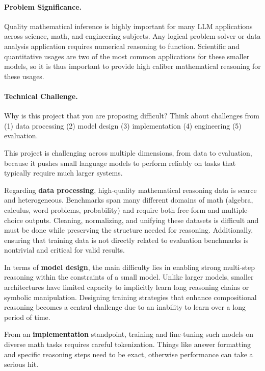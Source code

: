 \documentclass{article}
\begin{document}
\paragraph{Problem Significance.}
Quality mathematical inference is highly important for many LLM applications across science, math, and engineering subjects. Any logical problem-solver or data analysis application requires numerical reasoning to function. Scientific and quantitative usages are two of the most common applications for these smaller models, so it is thus important to provide high caliber mathematical reasoning for these usages.

\paragraph{Technical Challenge.}
Why is this project that you are proposing difficult? Think about challenges from (1) data processing (2) model design (3) implementation (4) engineering (5) evaluation. 

This project is challenging across multiple dimensions, from data to evaluation, because it pushes small language models to perform reliably on tasks that typically require much larger systems.

Regarding \textbf{data processing}, high-quality mathematical reasoning data is scarce and heterogeneous. Benchmarks span many different domains of math (algebra, calculus, word problems, probability) and require both free-form and multiple-choice outputs. Cleaning, normalizing, and unifying these datasets is difficult and must be done while preserving the structure needed for reasoning. Additionally, ensuring that training data is not directly related to evaluation benchmarks is nontrivial and critical for valid results.

In terms of \textbf{model design}, the main difficulty lies in enabling strong multi-step reasoning within the constraints of a small model. Unlike larger models, smaller architectures have limited capacity to implicitly learn long reasoning chains or symbolic manipulation. Designing training strategies that enhance compositional reasoning becomes a central challenge due to an inability to learn over a long period of time.

From an \textbf{implementation} standpoint, training and fine-tuning such models on diverse math tasks requires careful tokenization. Things like answer formatting and specific reasoning steps need to be exact, otherwise performance can take a serious hit. 
\end{document}
